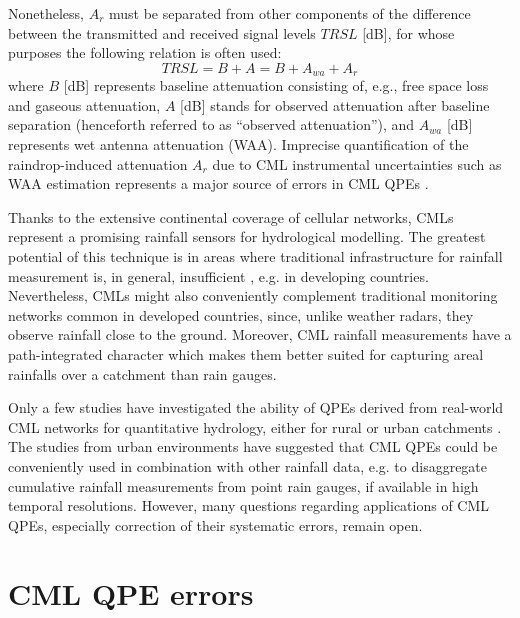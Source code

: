 \documentclass{ctuthesis}\usepackage[]{graphicx}\usepackage[]{color}
\begin{document}
Nonetheless, $A_r$ must be separated from other components of the difference between the transmitted and received signal levels $T\!R\!S\!L$ [dB], for whose purposes the following relation is often used: 
        \begin{equation} \label{eq:2eq2}
        T\!R\!S\!L = B + A = B + A_{wa} + A_r
        \end{equation}
where $B$ [dB] represents baseline attenuation consisting of, e.g., free space loss and gaseous attenuation, $A$ [dB] stands for observed attenuation after baseline separation (henceforth referred to as “observed attenuation”), and $A_{wa}$ [dB] represents wet antenna attenuation (WAA). Imprecise quantification of the raindrop-induced attenuation $A_r$ due to CML instrumental uncertainties such as WAA estimation represents a major source of errors in CML QPEs \citep[][more details in \ref{InstErr}]{chwalaCommercialMicrowaveLink2019}.


Thanks to the extensive continental coverage of cellular networks, CMLs represent a promising rainfall sensors for hydrological modelling. The greatest potential of this technique is in areas where traditional infrastructure for rainfall measurement is, in general, insufficient \citep{gossetImprovingRainfallMeasurement2016}, e.g. in developing countries. Nevertheless, CMLs might also conveniently complement traditional monitoring networks common in developed countries, since, unlike weather radars, they observe rainfall close to the ground. Moreover, CML rainfall measurements have a path-integrated character which makes them better suited for capturing areal rainfalls over a catchment than rain gauges. 

Only a few studies have investigated the ability of QPEs derived from real-world CML networks for quantitative hydrology, either for rural \citep{brauerEffectDifferencesRainfall2016, cazzanigaCalculatingHydrologicalResponse2020, smiatekPotentialCommercialMicrowave2017}  or urban catchments \citep{dischImpactDifferentSources2019, stranskyRunoffPredictionUsing2018}. The studies from urban environments have suggested that CML QPEs could be conveniently used in combination with other rainfall data, e.g. to disaggregate cumulative rainfall measurements from point rain gauges, if available in high temporal resolutions. However, many questions regarding  applications of CML QPEs, especially correction of their systematic errors, remain open.



\section{CML QPE errors}
\end{document}
